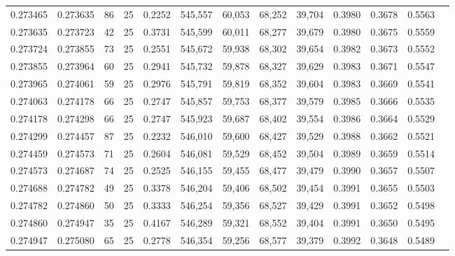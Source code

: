 \begin{tabular}{rrrrrrrrrrrrr}
0.273465 & 0.273635 &    86 &  25 &                                     0.2252 & 545,557 &  60,053 &  68,252 &  39,704 & 0.3980 & 0.3678 & 0.5563 \\
0.273635 & 0.273723 &    42 &  25 &                                     0.3731 & 545,599 &  60,011 &  68,277 &  39,679 & 0.3980 & 0.3675 & 0.5559 \\
0.273724 & 0.273855 &    73 &  25 &                                     0.2551 & 545,672 &  59,938 &  68,302 &  39,654 & 0.3982 & 0.3673 & 0.5552 \\
0.273855 & 0.273964 &    60 &  25 &                                     0.2941 & 545,732 &  59,878 &  68,327 &  39,629 & 0.3983 & 0.3671 & 0.5547 \\
0.273965 & 0.274061 &    59 &  25 &                                     0.2976 & 545,791 &  59,819 &  68,352 &  39,604 & 0.3983 & 0.3669 & 0.5541 \\
0.274063 & 0.274178 &    66 &  25 &                                     0.2747 & 545,857 &  59,753 &  68,377 &  39,579 & 0.3985 & 0.3666 & 0.5535 \\
0.274178 & 0.274298 &    66 &  25 &                                     0.2747 & 545,923 &  59,687 &  68,402 &  39,554 & 0.3986 & 0.3664 & 0.5529 \\
0.274299 & 0.274457 &    87 &  25 &                                     0.2232 & 546,010 &  59,600 &  68,427 &  39,529 & 0.3988 & 0.3662 & 0.5521 \\
0.274459 & 0.274573 &    71 &  25 &                                     0.2604 & 546,081 &  59,529 &  68,452 &  39,504 & 0.3989 & 0.3659 & 0.5514 \\
0.274573 & 0.274687 &    74 &  25 &                                     0.2525 & 546,155 &  59,455 &  68,477 &  39,479 & 0.3990 & 0.3657 & 0.5507 \\
0.274688 & 0.274782 &    49 &  25 &                                     0.3378 & 546,204 &  59,406 &  68,502 &  39,454 & 0.3991 & 0.3655 & 0.5503 \\
0.274782 & 0.274860 &    50 &  25 &                                     0.3333 & 546,254 &  59,356 &  68,527 &  39,429 & 0.3991 & 0.3652 & 0.5498 \\
0.274860 & 0.274947 &    35 &  25 &                                     0.4167 & 546,289 &  59,321 &  68,552 &  39,404 & 0.3991 & 0.3650 & 0.5495 \\
0.274947 & 0.275080 &    65 &  25 &                                     0.2778 & 546,354 &  59,256 &  68,577 &  39,379 & 0.3992 & 0.3648 & 0.5489 \\

\end{tabular}
